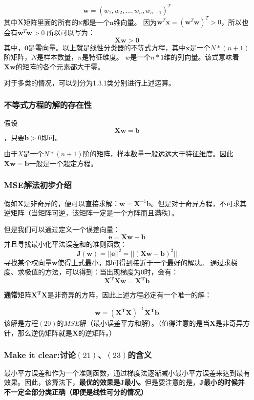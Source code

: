 \documentclass[12pt, letterpaper]{article}
\begin{document}
$$
\mathbf{w}=(w_1,w_2,\ldots,w_n,w_{n+1})^T
$$
其中$\mathbf{X}$矩阵里面的所有的$\mathbf{x}$都是一个n维向量。
因为$\mathbf{w}^T\mathbf{x}=(\mathbf{w}^T\mathbf{w})^T>0$，所以也会有$\mathbf{w}^T\mathbf{w}>0$
所以可以写为：
\begin{equation}
\mathbf{Xw}>\mathbf{0}
\end{equation}
其中，$\mathbf{0}$是零向量。以上就是线性分类器的不等式方程，其中$\mathbf{x}$是一个$N*(n+1)$阶矩阵，$N$是样本数量，$n$是特征维度。
$w$是一个$n*1$维的列向量。该式意味着$\mathbf{Xw}$的矩阵的各个元素都大于零。

对于多类的情况，可以划分为1.3.1类分别进行上述运算。

\subsubsection*{不等式方程的解的存在性}
假设
\begin{equation}
\mathbf{Xw}=\mathbf{b}
\end{equation}
，只要$\mathbf{b}>0$即可。

由于$X$是一个$N*(n+1)$阶的矩阵，样本数量一般远远大于特征维度。因此$\mathbf{Xw}=\mathbf{b}$一般是一个超定方程。
\subsubsection*{MSE解法初步介绍}
假如$\mathbf{X}$是非奇异的，便可以直接求解：$\mathbf{w}=\mathbf{X}^{-1}\mathbf{b}$。但是对于奇异方程，不可求其逆矩阵（当矩阵可逆，该矩阵一定是一个方阵而且满秩）。

但是我们可以通过定义一个误差向量：
$$ \mathbf{e}=\mathbf{Xw-b}$$
并且寻找最小化平法误差和的准则函数：
\begin{equation}
\mathbf{J}(\mathbf{w})=||\mathbf{e}||^2=||(\mathbf{Xw-b})^2||
\end{equation}
寻找某个权向量$\mathbf{w}$使得上式最小，即可得到接近于一个最好的解决。
通过求梯度、求极值的方法，可以得到：当出现梯度为$0$时，会有：
\begin{equation}
\mathbf{X^TXw=X^Tb}
\end{equation}

\textbf{通常}矩阵$\mathbf{X^TX}$是非奇异的方阵，因此上述方程必定有一个唯一的解：

\begin{equation}
\mathbf{w}=\mathbf{(X^TX)^{-1}X^Tb}
\end{equation}
该解是方程$(20)$的$MSE$解（最小误差平方和解）。（值得注意的是当$\mathbf{X}$是非奇异方针，那么逆伪矩阵就是$\mathbf{X}$的逆矩阵。）
\subsubsection*{Make it clear:讨论\texorpdfstring{$(21)$、$(23)$}{PDFstring}的含义}
最小平方误差和作为一个准则函数，通过梯度法逐渐减小最小平方误差来达到最有效果。因此，该算法下，\textbf{最优的效果是J最小。}但是要注意的是，\textbf{J最小的时候并不一定全部分类正确（即便是线性可分的情况）}
\end{document}
